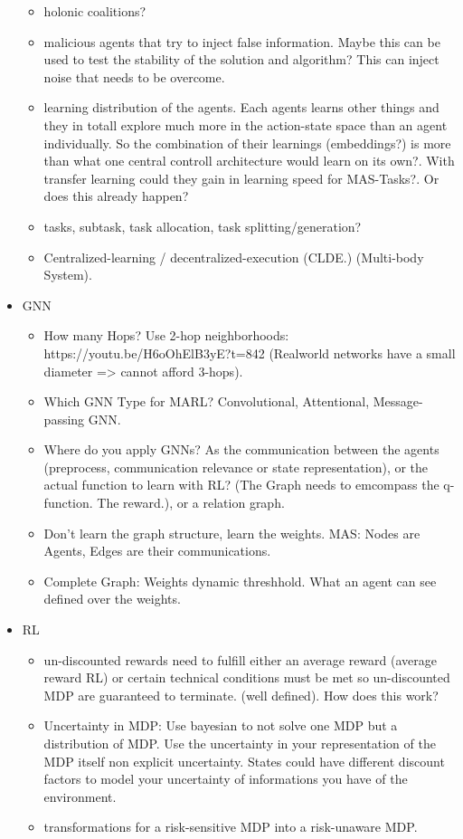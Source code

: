 \begin{itemize}[noitemsep,nolistsep]
\begin{itemize}[noitemsep,nolistsep]
		\item holonic coalitions?
		\item malicious agents that try to inject false information. Maybe this can be used to test the stability of the solution and algorithm? This can inject noise that needs to be overcome.
		\item learning distribution of the agents. Each agents learns other things and they in totall explore much more in the action-state space than an agent individually. So the combination of their learnings (embeddings?) is more than what one central controll architecture would learn on its own?. With transfer learning could they gain in learning speed for MAS-Tasks?. Or does this already happen?
		\item tasks, subtask, task allocation, task splitting/generation?
		\item Centralized-learning / decentralized-execution (CLDE.) (Multi-body System).
	\end{itemize}
	\item GNN
	\begin{itemize}[noitemsep,nolistsep]
		\item How many Hops? Use 2-hop neighborhoods: https://youtu.be/H6oOhElB3yE?t=842 (Realworld networks have a small diameter => cannot afford 3-hops).
		\item Which GNN Type for MARL? Convolutional, Attentional, Message-passing GNN.
		\item Where do you apply GNNs? As the communication between the agents (preprocess, communication relevance or state representation), or the actual function to learn with RL? (The Graph needs to emcompass the q-function. The reward.), or a relation graph. 
		\item Don't learn the graph structure, learn the weights. MAS: Nodes are Agents, Edges are their communications.
		\item Complete Graph: Weights dynamic threshhold. What an agent can see defined over the weights.
	\end{itemize}
	\item RL
	\begin{itemize}[noitemsep,nolistsep]
		\item un-discounted rewards need to fulfill either an average reward (average reward RL) or certain technical conditions must be met so un-discounted MDP are guaranteed to terminate. (well defined). How does this work?
		\item Uncertainty in MDP: Use bayesian to not solve one MDP but a distribution of MDP. Use the uncertainty in your representation of the MDP itself non explicit uncertainty. States could have different discount factors to model your uncertainty of informations you have of the environment.
		\item transformations for a risk-sensitive MDP into a risk-unaware MDP.
	\end{itemize}
\end{itemize}